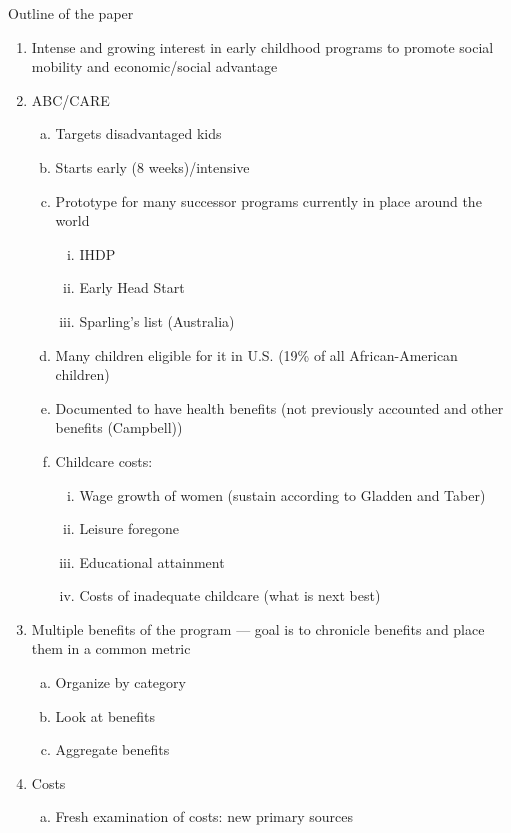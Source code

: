 \noindent Outline of the paper

\begin{enumerate}[(1)]
\item Intense and growing interest in early childhood programs to promote social mobility and economic/social advantage
\item ABC/CARE
    \begin{enumerate}[(a)]
    \item Targets disadvantaged kids
    \item Starts early (8 weeks)/intensive
    \item Prototype for many successor programs currently in place around the world
        \begin{enumerate}[(i)]
        \item IHDP
        \item Early Head Start
        \item Sparling's list (Australia)
        \end{enumerate}
    \item Many children eligible for it in U.S. (19\% of all African-American children)
    \item Documented to have health benefits (not previously accounted and other benefits (Campbell))
    \item Childcare costs:
        \begin{enumerate}[(i)]
        \item Wage growth of women (sustain according to Gladden and Taber)
        \item Leisure foregone
        \item Educational attainment
        \item Costs of inadequate childcare (what is next best)
        \end{enumerate}
    \end{enumerate}
\item Multiple benefits of the program --- goal is to chronicle benefits and place them in a common metric
    \begin{enumerate}[(a)]
    \item Organize by category
    \item Look at benefits
    \item Aggregate benefits
    \end{enumerate}
\item Costs
    \begin{enumerate}[(a)]
    \item Fresh examination of costs: new primary sources

\end{enumerate}
\end{enumerate}
